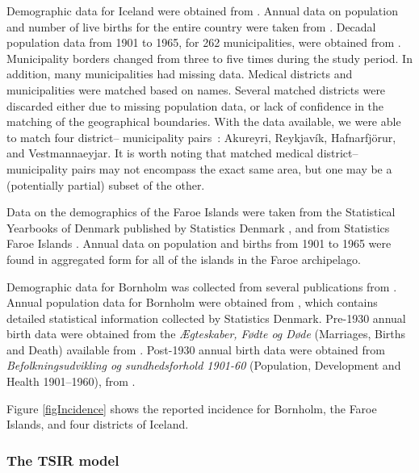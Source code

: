 \documentclass[10pt]{article}
\begin{document}
Demographic data for Iceland were obtained from \cite{StatsIceland}. Annual data on population and number of live births for the entire country were taken from \cite{StatsIcelandBirths}. Decadal population data from 1901 to 1965, for 262 municipalities, were obtained from \cite{StatsIcelandPop}. Municipality borders changed from three to five times during the study period. In addition, many municipalities had missing data. Medical districts and municipalities were matched based on names. Several matched districts were discarded either due to missing population data, or lack of confidence in the matching of the geographical boundaries. With the data available, we were able to match four district-- municipality pairs~: Akureyri, Reykjav\'{i}k, Hafnarfj\"{o}r\dh{}ur, and Vestmannaeyjar. It is worth noting that matched medical district--municipality pairs may not encompass the exact same area, but one may be a (potentially partial) subset of the other. 

Data on the demographics of the Faroe Islands were taken from the Statistical Yearbooks of Denmark published by Statistics Denmark \cite{StatsDenmark}, and from Statistics Faroe Islands \cite{StatsFaroe}. Annual data on population and births from 1901 to 1965 were found in aggregated form for all of the islands in the Faroe archipelago. 

Demographic data for Bornholm was collected from several publications from \cite{StatsDenmark}. Annual population data for Bornholm were obtained from \cite{StatsDenmarkPop}, which contains detailed statistical information collected by Statistics Denmark. Pre-1930 annual birth data were obtained from the \textit{\AE{}gteskaber, F\o{}dte og D\o{}de} (Marriages, Births and Death) available from \cite{StatsDenmarkBirths1}. Post-1930 annual birth data were obtained from \textit{Befolkningsudvikling og sundhedsforhold 1901-60} (Population, Development and Health 1901--1960), from \cite{StatsDenmarkBirths2}.

Figure \ref{figIncidence} shows the reported incidence for Bornholm, the Faroe Islands, and four districts of Iceland.










\subsubsection*{The TSIR model}
\end{document}
